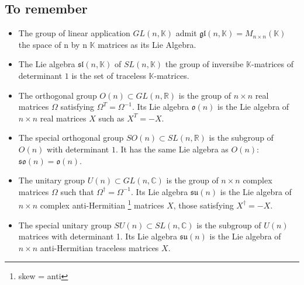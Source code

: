 \documentclass[11pt,a4paper]{article}
\theoremstyle{definition}
\numberwithin{equation}{section}
\begin{document}
\subsection{To remember}
\begin{itemize}
    \item The group of linear application $GL(n,\mathbb{K})$ admit $\mathfrak{gl}(n, \mathbb{K}) = M_{n\times n}(\mathbb{K})$ the space of n by n $\mathbb{K}$ matrices as its Lie Algebra.
    \item The Lie algebra $\mathfrak{sl}(n,\mathbb{K})$ of $SL(n,\mathbb{K})$ the group of inversibe  $\mathbb{K}$-matrices of determinant $1$ is the set of traceless $\mathbb{K}$-matrices.
    \item The orthogonal group $O(n) \subset  GL(n, \mathbb{R})$ is the group of $n \times n$ real matrices $\Omega$ satisfying $\Omega^T = \Omega^{-1}$. Its Lie algebra $\mathfrak{o}(n)$ is the Lie algebra of $n \times n$ real matrices $X$ such as $X^T = -X$.
    \item The special orthogonal group $SO(n) \subset SL(n,\mathbb{R})$ is the subgroup of $O(n)$ with determinant $1$. It has the same Lie algebra as $O(n)$: $\mathfrak{so}(n) = \mathfrak{o}(n)$.
    \item The unitary group  $U(n)\subset GL(n,\mathbb{C})$ is the group of $n \times n$ complex matrices $\Omega$ such that $\Omega^\dagger = \Omega^{-1}$. Its Lie algebra $\mathfrak{su}(n)$ is the Lie algebra of $n \times n$ complex anti-Hermitian \footnote{skew = anti} matrices $X$, those satisfying $X^\dagger = -X$.
    \item The special unitary group $SU(n)\subset SL(n,\mathbb{C})$ is the subgroup of $U(n)$ matrices with determinant 1. Its Lie algebra $\mathfrak{su}(n)$ is the Lie algebra of $n \times n$ anti-Hermitian  traceless matrices $X$.
\end{itemize}
\end{document}
